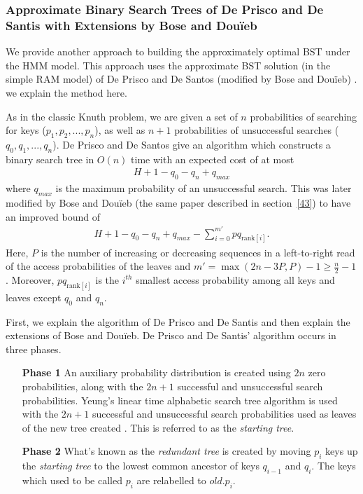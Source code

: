 \documentclass[]{beamer}
\theoremstyle{plain}
\begin{document}
\begin{frame} \frametitle{Approximate Binary Search Trees of De Prisco and De Santis with Extensions by Bose and Dou\"{i}eb} \label{sec:deBST}

We provide another approach to building the approximately optimal BST under the HMM model. This approach uses the approximate BST solution (in the simple RAM model) of De Prisco and De Santos (modified by Bose and Dou\"{i}eb) \cite{de1993binary, bose2009efficient}. we explain the method here.

As in the classic Knuth problem, we are given a set of $n$ probabilities of searching for keys ($p_1, p_2, ..., p_n$), as well as $n+1$ probabilities of unsuccessful searches ($q_0, q_1, ..., q_n$). De Prisco and De Santos give an algorithm which constructs a binary search tree in $O(n)$ time with an expected cost of at most \cite{de1993binary}
\begin{align*}
H+1-q_0-q_n+q_{max}
\end{align*}
  where $q_{max}$ is the maximum probability of an unsuccessful search. This was later modified by Bose and Dou\"{i}eb (the same paper described in section~\ref{43}) to have an improved bound of \cite{bose2009efficient}
\begin{align*}
H + 1 - q_0 - q_n + q_{max} - \sum_{i=0}^{m'} pq_{\text{rank}[i]}.
\end{align*}
Here, $P$ is the number of increasing or decreasing sequences in a left-to-right read of the access probabilities of the leaves and $m'=\max({2n-3P,P})-1 \geq \frac{n}{2} - 1$.  Moreover, $pq_{\text{rank}[i]}$ is the $i^{th}$ smallest access probability among all keys and leaves except $q_0$ and $q_n$.

First, we explain the algorithm of De Prisco and De Santis and then explain the extensions of Bose and Dou\"{i}eb. De Prisco and De Santis' algorithm occurs in three phases.

\begin{itemize}
\item[\textbf{Phase 1}] An auxiliary probability distribution is created using $2n$ zero probabilities, along with the $2n+1$ successful and unsuccessful search probabilities. Yeung's linear time alphabetic search tree algorithm is used with the $2n+1$ successful and unsuccessful search probabilities used as leaves of the new tree created \cite{yeung1991alphabetic}. This is referred to as the \textit{starting tree}.

\item[\textbf{Phase 2}] What's known as the \textit{redundant tree} is created by moving $p_i$ keys up the \textit{starting tree} to the lowest common ancestor of keys $q_{i-1}$ and $q_i$. The keys which used to be called $p_i$ are relabelled to $old.p_i$.


\end{itemize}
\end{frame}
\end{document}
